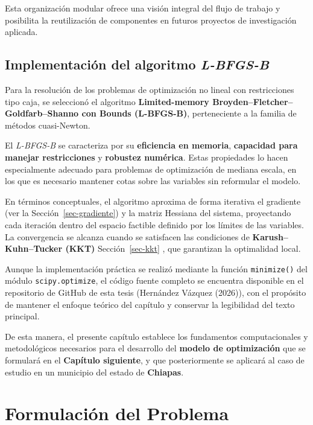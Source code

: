 \documentclass[
  spanish,
  us-letterpaper,
]{scrreprt}
\numberwithin{equation}{section}
\begin{document}
Esta organización modular ofrece una visión integral del flujo de
trabajo y posibilita la reutilización de componentes en futuros
proyectos de investigación aplicada.

\section{\texorpdfstring{Implementación del algoritmo
\emph{L-BFGS-B}}{Implementación del algoritmo L-BFGS-B}}\label{implementaciuxf3n-del-algoritmo-l-bfgs-b}

Para la resolución de los problemas de optimización no lineal con
restricciones tipo caja, se seleccionó el algoritmo
\textbf{Limited-memory Broyden--Fletcher--Goldfarb--Shanno con Bounds
(L-BFGS-B)}, perteneciente a la familia de métodos cuasi-Newton.

El \emph{L-BFGS-B} se caracteriza por su \textbf{eficiencia en memoria},
\textbf{capacidad para manejar restricciones} y \textbf{robustez
numérica}. Estas propiedades lo hacen especialmente adecuado para
problemas de optimización de mediana escala, en los que es necesario
mantener cotas sobre las variables sin reformular el modelo.

En términos conceptuales, el algoritmo aproxima de forma iterativa el
gradiente (ver la Sección~\ref{sec-gradiente}) y la matriz Hessiana del
sistema, proyectando cada iteración dentro del espacio factible definido
por los límites de las variables. La convergencia se alcanza cuando se
satisfacen las condiciones de \textbf{Karush--Kuhn--Tucker (KKT)}
Sección~\ref{sec-kkt} , que garantizan la optimalidad local.

Aunque la implementación práctica se realizó mediante la función
\texttt{minimize()} del módulo \texttt{scipy.optimize}, el código fuente
completo se encuentra disponible en el repositorio de GitHub de esta
tesis (Hernández Vázquez (2026)), con el propósito de mantener el
enfoque teórico del capítulo y conservar la legibilidad del texto
principal.

De esta manera, el presente capítulo establece los fundamentos
computacionales y metodológicos necesarios para el desarrollo del
\textbf{modelo de optimización} que se formulará en el \textbf{Capítulo
siguiente}, y que posteriormente se aplicará al caso de estudio en un
municipio del estado de \textbf{Chiapas}.


\chapter{Formulación del Problema}\label{formulaciuxf3n-del-problema}
\end{document}

